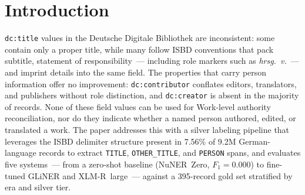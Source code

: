 \section{Introduction}
\label{sec:intro}

\texttt{dc:title} values in the Deutsche Digitale Bibliothek are inconsistent:
some contain only a proper title, while many follow ISBD conventions that pack
subtitle, statement of responsibility~--- including role markers such as
\textit{hrsg.\ v.}~--- and imprint details into the same field.
The properties that carry person information offer no improvement:
\texttt{dc:contributor} conflates editors, translators, and publishers without
role distinction, and \texttt{dc:creator} is absent in the majority of records.
None of these field values can be used for Work-level authority reconciliation,
nor do they indicate whether a named person authored, edited, or translated a work.
The paper addresses this with a silver labeling pipeline that leverages the ISBD
delimiter structure present in 7.56\% of 9.2M German-language records to extract
\texttt{TITLE}, \texttt{OTHER\_TITLE}, and \texttt{PERSON} spans, and evaluates
five systems~--- from a zero-shot baseline (NuNER~Zero, $F_1 = 0.000$) to
fine-tuned GLiNER and XLM-R~large~--- against a 395-record gold set stratified
by era and silver tier.


\endinput

